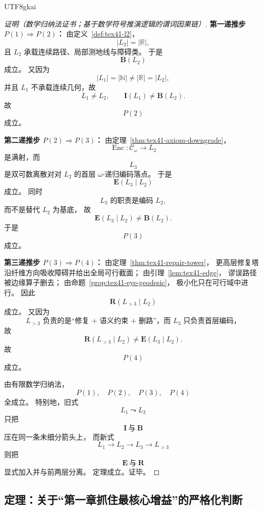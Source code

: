 \documentclass[12pt]{article}
\newcommand{\NN}{\mathbb{N}}
\newcommand{\RR}{\mathbb{R}}
\newcommand{\CodeSpace}{\mathcal{C}_\omega}
\newcommand{\Enc}{\operatorname{Enc}}
\begin{document}
\begin{CJK*}{UTF8}{gkai}
\begin{proof}[证明（数学归纳法证书；基于数学符号推演逻辑的谓词因果链）]
\textbf{第一递推步 $P(1)\Rightarrow P(2)$：}
由定义~\ref{def:tex41-l2}，
\[
  |L_2|=|\RR|,
\]
且 $L_2$ 承载连续路径、局部测地线与障碍类。
于是
\[
  \mathbf B(L_2)
\]
成立。
又因为
\[
  |L_1|=|\NN|\neq|\RR|=|L_2|,
\]
并且 $L_1$ 不承载连续几何，故
\[
  L_1\neq L_2,
  \qquad
  \mathbf I(L_1)\neq \mathbf B(L_2).
\]
故
\[
  P(2)
\]
成立。

\textbf{第二递推步 $P(2)\Rightarrow P(3)$：}
由定理~\ref{thm:tex41-axiom-downgrade}，
\[
  \Enc:\CodeSpace\to L_2
\]
是满射，而
\[
  L_3
\]
是双可数离散对对 $L_2$ 的首层 $\omega$-递归编码落点。
于是
\[
  \mathbf E(L_3\mid L_2)
\]
成立。
同时
\[
  L_3\text{ 的职责是编码 }L_2,
\]
而不是替代 $L_2$ 为基底，
故
\[
  \mathbf E(L_3\mid L_2)\neq \mathbf B(L_2).
\]
于是
\[
  P(3)
\]
成立。

\textbf{第三递推步 $P(3)\Rightarrow P(4)$：}
由定理~\ref{thm:tex41-repair-tower}，
更高层修复塔沿纤维方向吸收障碍并给出全局可行截面；
由引理~\ref{lem:tex41-edge}，
谬误路径被边缘算子删去；
由命题~\ref{prop:tex41-eye-geodesic}，
极小化只在可行域中进行。
因此
\[
  \mathbf R(L_{>3}\mid L_2)
\]
成立。
又因为
\[
  L_{>3}\text{ 负责的是“修复 + 语义约束 + 删路”，而 }L_3\text{ 只负责首层编码，}
\]
故
\[
  \mathbf R(L_{>3}\mid L_2)\neq \mathbf E(L_3\mid L_2).
\]
故
\[
  P(4)
\]
成立。

由有限数学归纳法，
\[
  P(1),\quad P(2),\quad P(3),\quad P(4)
\]
全成立。
特别地，旧式
\[
  L_1\leadsto L_2
\]
只把
\[
  \mathbf I\ \text{与}\ \mathbf B
\]
压在同一条未细分箭头上，
而新式
\[
  L_1\to L_2\to L_3\to L_{>3}
\]
则把
\[
  \mathbf E\ \text{与}\ \mathbf R
\]
显式加入并与前两层分离。
定理成立。证毕。
\end{proof}

\subsection{定理：关于“第一章抓住最核心增益”的严格化判断}
\label{subsec:tex41-upgrade-theorem}


\end{CJK*}
\end{document}
